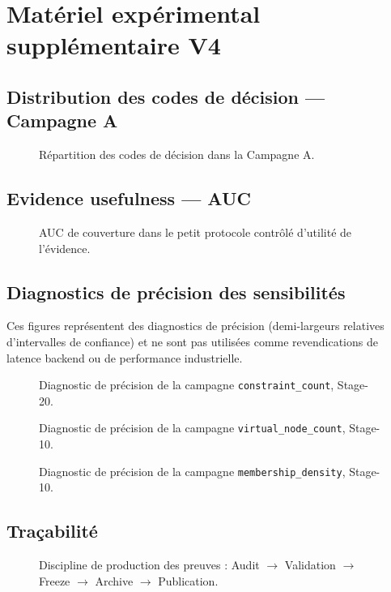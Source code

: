 \section{Matériel expérimental supplémentaire V4}
\label{sec:v4-supplement}

\subsection{Distribution des codes de décision — Campagne A}
\begin{figure}[!t]
\centering

\caption{Répartition des codes de décision dans la Campagne A.}
\end{figure}

\subsection{Evidence usefulness — AUC}
\begin{figure}[!t]
\centering

\caption{AUC de couverture dans le petit protocole contrôlé d'utilité de l'évidence.}
\end{figure}

\subsection{Diagnostics de précision des sensibilités}
Ces figures représentent des diagnostics de précision (demi-largeurs relatives
d'intervalles de confiance) et ne sont pas utilisées comme revendications de
latence backend ou de performance industrielle.

\begin{figure}[!t]
\centering

\caption{Diagnostic de précision de la campagne \texttt{constraint\_count}, Stage-20.}
\end{figure}

\begin{figure}[!t]
\centering

\caption{Diagnostic de précision de la campagne \texttt{virtual\_node\_count}, Stage-10.}
\end{figure}

\begin{figure}[!t]
\centering

\caption{Diagnostic de précision de la campagne \texttt{membership\_density}, Stage-10.}
\end{figure}

\subsection{Traçabilité}
\begin{figure}[!t]
\centering
\resizebox{\linewidth}{!}{}
\caption{Discipline de production des preuves : Audit $\rightarrow$ Validation $\rightarrow$ Freeze $\rightarrow$ Archive $\rightarrow$ Publication.}
\end{figure}
